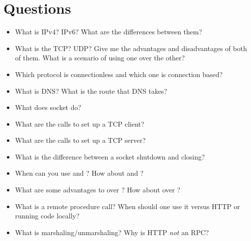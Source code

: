 \section{Questions}

\begin{itemize}
\item
  What is IPv4? IPv6? What are the differences between them?
\item
  What is the TCP? UDP? Give me the advantages and disadvantages of both of them.
  What is a scenario of using one over the other?
\item
  Which protocol is connectionless and which one is connection based?
\item
  What is DNS? What is the route that DNS takes?
\item
  What does socket do?
\item
  What are the calls to set up a TCP client?
\item
  What are the calls to set up a TCP server?
\item
  What is the difference between a socket shutdown and closing?
\item
  When can you use  and ? How about  and ?
\item
  What are some advantages to  over ? How about  over ?
\item
  What is a remote procedure call? When should one use it versus HTTP or running code locally?
\item
  What is marshaling/unmarshaling? Why is HTTP \emph{not} an RPC?
\end{itemize}



